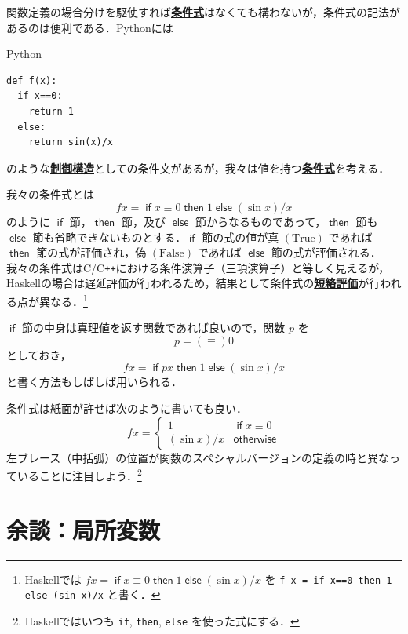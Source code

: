 \documentclass[a4paper,twocolumn]{jsbook}
\newcommand{\programminglanguage}[1]{\textsf{#1}}
\newcommand{\clang}{\programminglanguage{C}}
\newcommand{\cxx}{\programminglanguage{C}\texttt{++}}
\newcommand{\haskell}{\programminglanguage{Haskell}}
\newcommand{\python}{\programminglanguage{Python}}
\newcommand{\keyword}[1]{{\underline{\textbf{#1}}}}
\newcommand{\code}[1]{\texttt{#1}}
\newenvironment{pythoncode}{\begin{itembox}[r]{\python}}{\end{itembox}}
\newcommand{\mKeyword}[1]{\mathsf{#1}} %
\newcommand{\mIfKeyword}{\mKeyword{if}}
\newcommand{\mElseKeyword}{\mKeyword{else}}
\newcommand{\mOtherwiseKeyword}{\mKeyword{otherwise}}
\newcommand{\mThenKeyword}{\mKeyword{then}}
\DeclareMathOperator{\mElse}{\mElseKeyword}
\DeclareMathOperator{\mIf}{\mIfKeyword}
\DeclareMathOperator{\mOtherwise}{\mOtherwiseKeyword}
\DeclareMathOperator{\mThen}{\mThenKeyword}
\newcommand{\mSpecialConstant}[1]{\textrm{#1}} %
\newcommand{\mFalse}{\mSpecialConstant{False}}
\newcommand{\mTrue}{\mSpecialConstant{True}}
\newcommand{\mIfThenElse}[3]{\mIf{#1}\mThen{#2}\mElse{#3}}
\begin{document}

関数定義の場合分けを駆使すれば\keyword{条件式}はなくても構わないが，条件式の記法があるのは便利である．\python には
\begin{pythoncode}
\begin{verbatim}
def f(x):
  if x==0:
    return 1
  else:
    return sin(x)/x
\end{verbatim}
\end{pythoncode}
のような\keyword{制御構造}としての条件文があるが，我々は値を持つ\keyword{条件式}を考える．

我々の条件式とは
\begin{equation}
fx
=\mIfThenElse{x\equiv0}{1}{{}(\sin x)/x}
\end{equation}
のように $\mIf$ 節，$\mThen$ 節，及び $\mElse$ 節からなるものであって，$\mThen$ 節も $\mElse$ 節も省略できないものとする．$\mIf$ 節の式の値が真 $(\mTrue)$ であれば $\mThen$ 節の式が評価され，偽 $(\mFalse)$ であれば $\mElse$ 節の式が評価される．我々の条件式は\clang/\cxx における条件演算子（三項演算子）と等しく見えるが，\haskell の場合は遅延評価が行われるため，結果として条件式の\keyword{短絡評価}が行われる点が異なる．\footnote{\haskell では $fx=\mIfThenElse{x\equiv0}{1}{{}(\sin x)/x}$ を \code{f x = if x==0 then 1 else (sin x)/x} と書く．}

$\mIf$ 節の中身は真理値を返す関数であれば良いので，関数 $p$ を
\begin{equation}
p=(\equiv)0
\end{equation}
としておき，
\begin{equation}
fx=\mIfThenElse{px}{1}{{}(\sin x)/x}
\end{equation}
と書く方法もしばしば用いられる．

条件式は紙面が許せば次のように書いても良い．
\begin{equation}
fx=\begin{cases}
1&\mIf x\equiv0\\
(\sin x)/x&\mOtherwise
\end{cases}
\end{equation}
左ブレース（中括弧）の位置が関数のスペシャルバージョンの定義の時と異なっていることに注目しよう．\footnote{\haskell ではいつも \code{if}, \code{then}, \code{else} を使った式にする．}

\section{余談：局所変数}
\end{document}
